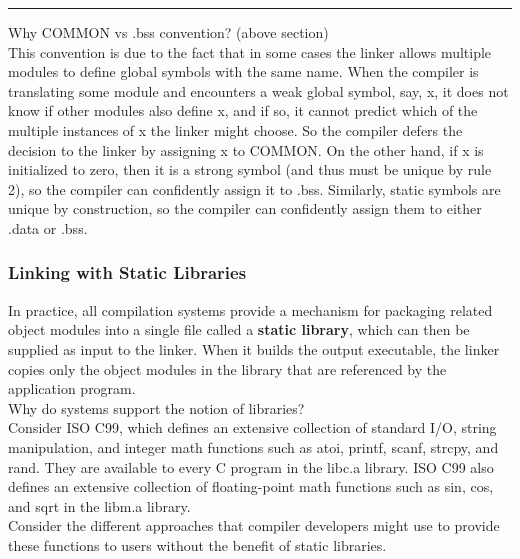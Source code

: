 \documentclass[11pt]{article}
\begin{document}
\noindent\rule{\textwidth}{0.5pt}

Why COMMON vs .bss convention? (above section)\\
This convention is due to the fact that in some cases the linker allows multiple modules to define global symbols with the same name. When the compiler is translating some module and encounters a weak global symbol, say, x, it does not know if other modules also define x, and if so, it cannot predict which of the multiple instances of x the linker might choose. So the compiler defers the decision to the linker by assigning x to COMMON. On the other hand, if x is initialized to zero, then it is a strong symbol (and thus must be unique by rule 2), so the compiler can confidently assign it to .bss. Similarly, static symbols are unique by construction, so the compiler can confidently assign them to either .data or .bss.\\


\subsubsection{Linking with Static Libraries}
\label{sec:orgc831451}
In practice, all compilation systems provide a mechanism for packaging related object modules into a single file called a \textbf{static library}, which can then be supplied as input to the linker. When it builds the output executable, the linker copies only the object modules in the library that are referenced by the application program.\\


Why do systems support the notion of libraries?\\
Consider ISO C99, which defines an extensive collection of standard I/O, string manipulation, and integer math functions such as atoi, printf, scanf, strcpy, and rand. They are available to every C program in the libc.a library. ISO C99 also defines an extensive collection of floating-point math functions such as sin, cos, and sqrt in the libm.a library.\\

Consider the different approaches that compiler developers might use to provide these functions to users without the benefit of static libraries.\\
\end{document}
